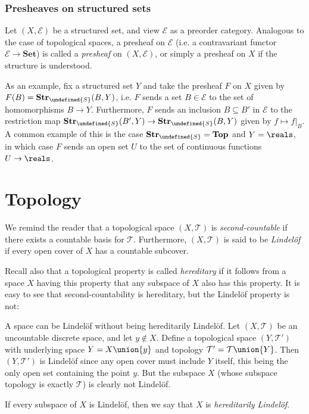 \documentclass[article, a4paper, 11pt, oneside]{memoir}
\let\mathfrak\undefined
\numberwithin{equation}{chapter}
\newcommand{\calT}{\mathcal{T}}
\newcommand{\calE}{\mathcal{E}}
\newcommand{\strucS}{\mathfrak{S}}
\newcommand{\ncat}[1]{\mathbf{#1}} %
\newcommand{\catSet}{\ncat{Set}} %
\newcommand{\catTop}{\ncat{Top}} %
\newcommand{\catStruc}[1]{\ncat{Str}_{#1}} %
\newcommand{\catStrucS}{\catStruc{\strucS}} %
\begin{document}
\subsection{Presheaves on structured sets}

Let $(X, \calE)$ be a structured set, and view $\calE$ as a preorder category. Analogous to the case of topological spaces, a presheaf on $\calE$ (i.e. a contravariant functor $\calE \to \catSet$) is called a \emph{presheaf} on $(X, \calE)$, or simply a presheaf on $X$ if the structure is understood.

As an example, fix a structured set $Y$ and take the presheaf $F$ on $X$ given by $F(B) = \catStrucS(B,Y)$, i.e. $F$ sends a set $B \in \calE$ to the set of homomorphisms $B \to Y$. Furthermore, $F$ sends an inclusion $B \subseteq B'$ in $\calE$ to the restriction map $\catStrucS(B',Y) \to \catStrucS(B,Y)$ given by $f \mapsto f|_B$. A common example of this is the case $\catStrucS = \catTop$ and $Y = \reals$, in which case $F$ sends an open set $U$ to the set of continuous functions $U \to \reals$.



\chapter{Topology}

We remind the reader that a topological space $(X, \calT)$ is \emph{second-countable} if there exists a countable basis for $\calT$. Furthermore, $(X, \calT)$ is said to be \emph{Lindelöf} if every open cover of $X$ has a countable subcover.

Recall also that a topological property is called \emph{hereditary} if it follows from a space $X$ having this property that any subspace of $X$ also has this property. It is easy to see that second-countability is hereditary, but the Lindelöf property is not:

\begin{remark}
    A space can be Lindelöf without being hereditarily Lindelöf. Let $(X, \calT)$ be an uncountable discrete space, and let $y \not\in X$. Define a topological space $(Y, \calT')$ with underlying space $ Y = X \union \{y\}$ and topology $\calT' = \calT \union \{Y\}$. Then $(Y, \calT')$ is Lindelöf since any open cover must include $Y$ itself, this being the only open set containing the point $y$. But the subspace $X$ (whose subspace topology is exactly $\calT$) is clearly not Lindelöf.
\end{remark}
%
If every subspace of $X$ is Lindelöf, then we say that $X$ is \emph{hereditarily Lindelöf}.
\end{document}
